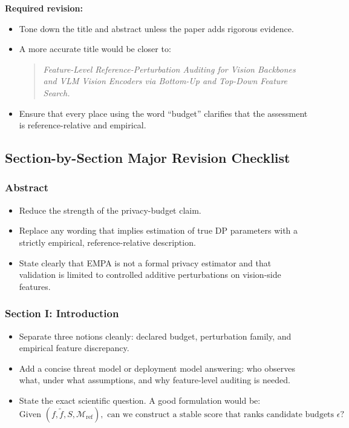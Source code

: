 \textbf{Required revision:}
\begin{itemize}
    \item Tone down the title and abstract unless the paper adds rigorous evidence.
    \item A more accurate title would be closer to:
    \begin{quote}
    \emph{Feature-Level Reference-Perturbation Auditing for Vision Backbones and VLM Vision Encoders via Bottom-Up and Top-Down Feature Search.}
    \end{quote}
    \item Ensure that every place using the word ``budget'' clarifies that the assessment is reference-relative and empirical.
\end{itemize}

\subsection*{Section-by-Section Major Revision Checklist}

\subsubsection*{Abstract}
\begin{itemize}
    \item Reduce the strength of the privacy-budget claim.
    \item Replace any wording that implies estimation of true DP parameters with a strictly empirical, reference-relative description.
    \item State clearly that EMPA is not a formal privacy estimator and that validation is limited to controlled additive perturbations on vision-side features.
\end{itemize}

\subsubsection*{Section I: Introduction}
\begin{itemize}
    \item Separate three notions cleanly: declared budget, perturbation family, and empirical feature discrepancy.
    \item Add a concise threat model or deployment model answering: who observes what, under what assumptions, and why feature-level auditing is needed.
    \item State the exact scientific question. A good formulation would be:
    \begin{equation}
    \text{Given } (f, \tilde{f}, S, \mathcal{M}_{\mathrm{ref}}), \text{ can we construct a stable score that ranks candidate budgets } \epsilon?
    \end{equation}
\end{itemize}

